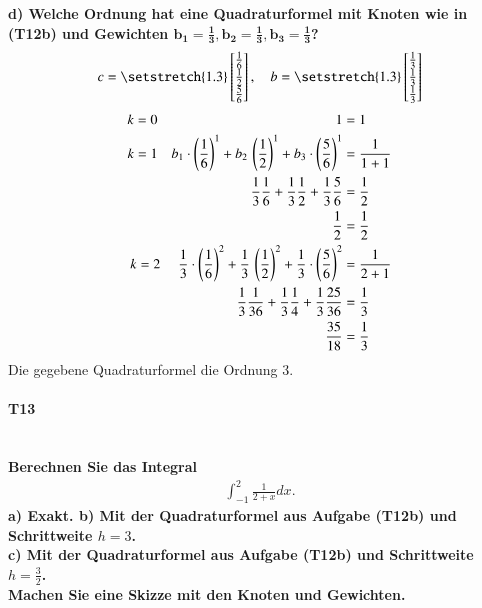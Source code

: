 \documentclass[10pt,a4paper]{article}
\begin{document}
    \textbf{%
        d) Welche Ordnung hat eine Quadraturformel mit Knoten wie in (T12b) und Gewichten $\pmb{b_1=\frac{1}{3}, b_2=\frac{1}{3}, b_3=\frac{1}{3}}$?
    }\\
	\begin{align*}
		c = \begingroup %
			\setstretch{1.3}
			\begin{bmatrix}
				\frac{1}{6} \\
				\frac{1}{2} \\
				\frac{5}{6}
			\end{bmatrix}
			\endgroup,  \quad
		b = \begingroup %
			\setstretch{1.3}
			\begin{bmatrix}
				\frac{1}{3} \\
				\frac{1}{3} \\
				\frac{1}{3}
			\end{bmatrix}
			\endgroup
	\end{align*}
	\begin{align*}
		k=0 \hspace{4.5cm}1&=1 \\
		k=1  \quad  b_1\cdot \left( \frac{1}{6}\right)^1+  b_2  \, \left(\frac{1}{2} \right)^1+  b_3\cdot\left( \frac{5}{6}\right)^1 & = \frac{1}{1+1} \\
		\frac{1}{3}\frac{1}{6}+ \frac{1}{3}  \frac{1}{2} + \frac{1}{3} \frac{5}{6}                                                   & = \frac{1}{2} \\
		\frac{1}{2} & = \frac{1}{2} \\
		k=2 \hspace{0.1cm} \quad  \frac{1}{3}\cdot \left( \frac{1}{6}\right)^2+  \frac{1}{3}  \, \left(\frac{1}{2} \right)^2+  \frac{1}{3}\cdot\left( \frac{5}{6}\right)^2 & = \frac{1}{2+1} \\
		\frac{1}{3}\frac{1}{36}+  \frac{1}{3}  \frac{1}{4} + \frac{1}{3} \frac{25}{36} & = \frac{1}{3} \\
		\frac{35}{18} &= \frac{1}{3}
	\end{align*}
	Die gegebene Quadraturformel die Ordnung 3.
    \pagebreak
    \paragraph{T13}\mbox{}\\
    \textbf{%
        Berechnen Sie das Integral
        \begin{align*}
            \int_{-1}^{2}\frac{1}{2+x}dx.
        \end{align*}
        a) Exakt.
        b) Mit der Quadraturformel aus Aufgabe (T12b) und Schrittweite $h=3$. \\
        c) Mit der Quadraturformel aus Aufgabe (T12b) und Schrittweite $h=\frac{3}{2}$. \\
        Machen Sie eine Skizze mit den Knoten und Gewichten.
    }\\
	
\end{document}

